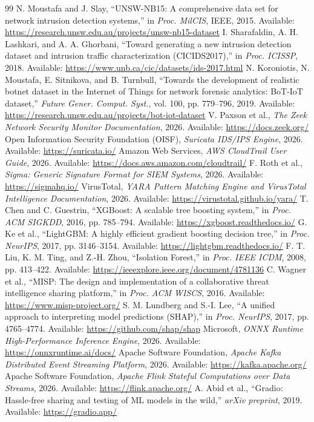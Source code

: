 \documentclass[10pt,a4paper]{article}
\begin{document}
\begin{thebibliography}{99}
\footnotesize
{} N. Moustafa and J. Slay, ``UNSW-NB15: A comprehensive data set for network intrusion detection systems,'' in \emph{Proc. MilCIS}, IEEE, 2015. Available: \url{https://research.unsw.edu.au/projects/unsw-nb15-dataset}
 I. Sharafaldin, A. H. Lashkari, and A. A. Ghorbani, ``Toward generating a new intrusion detection dataset and intrusion traffic characterization (CICIDS2017),'' in \emph{Proc. ICISSP}, 2018. Available: \url{https://www.unb.ca/cic/datasets/ids-2017.html}
 N. Koroniotis, N. Moustafa, E. Sitnikova, and B. Turnbull, ``Towards the development of realistic botnet dataset in the Internet of Things for network forensic analytics: BoT-IoT dataset,'' \emph{Future Gener. Comput. Syst.}, vol. 100, pp. 779--796, 2019. Available: \url{https://research.unsw.edu.au/projects/bot-iot-dataset}
 V. Paxson et al., \emph{The Zeek Network Security Monitor Documentation}, 2026. Available: \url{https://docs.zeek.org/}
 Open Information Security Foundation (OISF), \emph{Suricata IDS/IPS Engine}, 2026. Available: \url{https://suricata.io/}
 Amazon Web Services, \emph{AWS CloudTrail User Guide}, 2026. Available: \url{https://docs.aws.amazon.com/cloudtrail/}
 F. Roth et al., \emph{Sigma: Generic Signature Format for SIEM Systems}, 2026. Available: \url{https://sigmahq.io/}
 VirusTotal, \emph{YARA Pattern Matching Engine and VirusTotal Intelligence Documentation}, 2026. Available: \url{https://virustotal.github.io/yara/}
 T. Chen and C. Guestrin, ``XGBoost: A scalable tree boosting system,'' in \emph{Proc. ACM SIGKDD}, 2016, pp. 785--794. Available: \url{https://xgboost.readthedocs.io/}
 G. Ke et al., ``LightGBM: A highly efficient gradient boosting decision tree,'' in \emph{Proc. NeurIPS}, 2017, pp. 3146--3154. Available: \url{https://lightgbm.readthedocs.io/}
 F. T. Liu, K. M. Ting, and Z.-H. Zhou, ``Isolation Forest,'' in \emph{Proc. IEEE ICDM}, 2008, pp. 413--422. Available: \url{https://ieeexplore.ieee.org/document/4781136}
 C. Wagner et al., ``MISP: The design and implementation of a collaborative threat intelligence sharing platform,'' in \emph{Proc. ACM WISCS}, 2016. Available: \url{https://www.misp-project.org/}
 S. M. Lundberg and S.-I. Lee, ``A unified approach to interpreting model predictions (SHAP),'' in \emph{Proc. NeurIPS}, 2017, pp. 4765--4774. Available: \url{https://github.com/shap/shap}
 Microsoft, \emph{ONNX Runtime High-Performance Inference Engine}, 2026. Available: \url{https://onnxruntime.ai/docs/}
 Apache Software Foundation, \emph{Apache Kafka Distributed Event Streaming Platform}, 2026. Available: \url{https://kafka.apache.org/}
 Apache Software Foundation, \emph{Apache Flink Stateful Computations over Data Streams}, 2026. Available: \url{https://flink.apache.org/}
 A. Abid et al., ``Gradio: Hassle-free sharing and testing of ML models in the wild,'' \emph{arXiv preprint}, 2019. Available: \url{https://gradio.app/}
\end{thebibliography}
\end{document}
